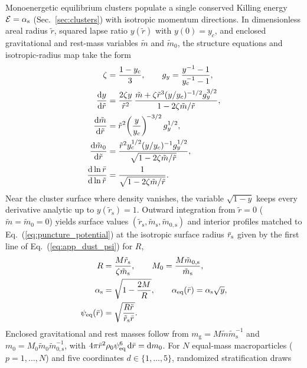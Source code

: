 Monoenergetic equilibrium clusters \cite{1985ApJ...298...34S} populate a single conserved Killing energy $\mathcal{E}=\alpha_{\mathrm{s}}$ (Sec.~\ref{sec:clusters}) with isotropic momentum directions. In dimensionless areal radius $\tilde{r}$, squared lapse ratio $y(\tilde{r})$ with $y(0)=y_c$, and enclosed gravitational and rest-mass variables $\tilde{m}$ and $\tilde{m}_0$, the structure equations and isotropic-radius map take the form
\begin{align}\label{eq:app_structure}
\zeta&=\frac{1-y_c}{3},\qquad g_y=\frac{y^{-1}-1}{y_c^{-1}-1},\nonumber\\
\frac{\mathrm{d} y}{\mathrm{d}\tilde{r}}&=\frac{2\zeta y}{\tilde{r}^2}\,\frac{\tilde{m}+\zeta\tilde{r}^3(y/y_c)^{-1/2}g_y^{3/2}}{1-2\zeta\tilde{m}/\tilde{r}},\nonumber\\
\frac{\mathrm{d}\tilde{m}}{\mathrm{d}\tilde{r}}&=\tilde{r}^2\!\left(\frac{y}{y_c}\right)^{\!-3/2}g_y^{1/2},\nonumber\\
\frac{\mathrm{d}\tilde{m}_0}{\mathrm{d}\tilde{r}}&=\frac{\tilde{r}^2y_c^{1/2}(y/y_c)^{-1}g_y^{1/2}}{\sqrt{1-2\zeta\tilde{m}/\tilde{r}}},\nonumber\\
\frac{\mathrm{d}\ln\bar{r}}{\mathrm{d}\ln\tilde{r}}&=\frac{1}{\sqrt{1-2\zeta\tilde{m}/\tilde{r}}}.
\end{align}
Near the cluster surface where density vanishes, the variable $\sqrt{1-y}$ keeps every derivative analytic up to $y(\tilde{r}_{\mathrm{s}})=1$. Outward integration from $\tilde{r}=0$ ($\tilde{m}=\tilde{m}_0=0$) yields surface values $(\tilde{r}_{\mathrm{s}},\tilde{m}_{\mathrm{s}},\tilde{m}_{0,\mathrm{s}})$ and interior profiles matched to Eq.~(\ref{eq:puncture_potential}) at the isotropic surface radius $\bar{r}_{\mathrm{s}}$ given by the first line of Eq.~(\ref{eq:app_dust_psi}) for $R$,
\begin{align}\label{eq:app_cluster_profiles}
R&=\frac{M\tilde{r}_{\mathrm{s}}}{\zeta\tilde{m}_{\mathrm{s}}},\qquad M_0=\frac{M\tilde{m}_{0,\mathrm{s}}}{\tilde{m}_{\mathrm{s}}},\nonumber\\
\alpha_{\mathrm{s}}&=\sqrt{1-\frac{2M}{R}},\qquad\alpha_{\mathrm{eq}}(\bar{r})=\alpha_{\mathrm{s}}\sqrt{y},\nonumber\\
\psi_{\mathrm{eq}}(\bar{r})&=\sqrt{\frac{R\tilde{r}}{\tilde{r}_{\mathrm{s}}\bar{r}}}.
\end{align}
Enclosed gravitational and rest masses follow from $m_{\mathrm{g}}=M\tilde{m}\tilde{m}_{\mathrm{s}}^{-1}$ and $m_0=M_0\tilde{m}_0\tilde{m}_{0,\mathrm{s}}^{-1}$, with $4\pi\bar{r}^2\rho_0\psi_{\mathrm{eq}}^6\,\mathrm{d}\bar{r}=\mathrm{d} m_0$. For $N$ equal-mass macroparticles ($p=1,\dots,N$) and five coordinates $d\in\{1,\dots,5\}$, randomized stratification draws
